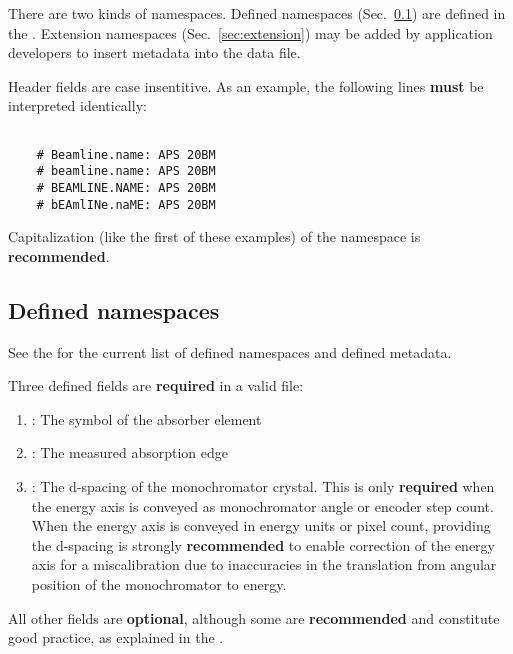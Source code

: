 \documentclass{article}
\begin{document}
There are two kinds of namespaces.  Defined namespaces
(Sec.~\ref{sec:defnamespaces}) are defined in the {\DMD}.  Extension
namespaces (Sec.~\ref{sec:extension}) may be added by application
developers to insert metadata into the data file.


Header fields are case insentitive. As an example, the following lines
\textbf{must} be interpreted identically:

\begin{center}
\begin{Boxedminipage}[h]{0.7\linewidth}
\begin{verbatim}

    # Beamline.name: APS 20BM
    # beamline.name: APS 20BM
    # BEAMLINE.NAME: APS 20BM
    # bEAmlINe.naME: APS 20BM

\end{verbatim}
\end{Boxedminipage}
\end{center}

Capitalization (like the first of these examples) of the namespace is
\textbf{recommended}.


\subsection{Defined namespaces}
\label{sec:defnamespaces}

See the {\DMD} for the current list of defined namespaces and defined
metadata.

Three defined fields are \textbf{required} in a valid {\xdi} file:

\begin{enumerate}
\item {}: The symbol of the absorber element
\item {}: The measured absorption edge
\item {}: The d-spacing of the monochromator
  crystal.  This is only \textbf{required} when the energy axis is
  conveyed as monochromator angle or encoder step count.  When the
  energy axis is conveyed in energy units or pixel count, providing
  the d-spacing is strongly \textbf{recommended} to enable correction
  of the energy axis for a miscalibration due to inaccuracies in the
  translation from angular position of the monochromator to energy.
\end{enumerate}

All other fields are \textbf{optional}, although some are
\textbf{recommended} and constitute good practice, as explained in the
{\DMD}.
\end{document}
